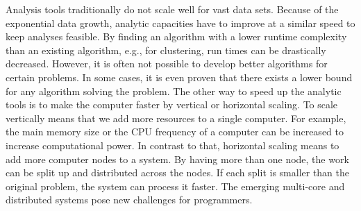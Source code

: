 Analysis tools traditionally do not scale well for vast data sets.
Because of the exponential data growth, analytic capacities have to improve at a similar speed to keep analyses feasible. 
By finding an algorithm with a lower runtime complexity than an existing algorithm, e.g., for clustering, run times can be drastically decreased. 
However, it is often not possible to develop better algorithms for certain problems. In some cases, it is even proven that there exists a lower bound for any algorithm solving the problem.
The other way to speed up the analytic tools is to make the computer faster by vertical or horizontal scaling. To scale vertically means that we add more resources to a single computer.
For example, the main memory size or the CPU frequency of a computer can be increased to increase computational power.
In contrast to that, horizontal scaling means to add more computer nodes to a system.
By having more than one node, the work can be split up and distributed across the nodes.
If each split is smaller than the original problem, the system can process it faster. %
The emerging multi-core and distributed systems pose new challenges for programmers.%
